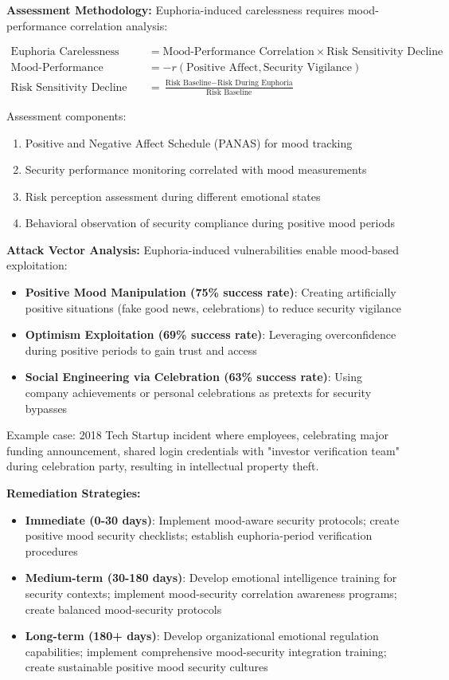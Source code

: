\documentclass[11pt,a4paper]{article}
\begin{document}
\textbf{Assessment Methodology:}
Euphoria-induced carelessness requires mood-performance correlation analysis:

\begin{align}
\text{Euphoria Carelessness Index} &= \text{Mood-Performance Correlation} \times \text{Risk Sensitivity Decline} \\
\text{Mood-Performance Correlation} &= -r(\text{Positive Affect}, \text{Security Vigilance}) \\
\text{Risk Sensitivity Decline} &= \frac{\text{Risk Baseline} - \text{Risk During Euphoria}}{\text{Risk Baseline}}
\end{align}

Assessment components:
\begin{enumerate}
\item Positive and Negative Affect Schedule (PANAS) for mood tracking
\item Security performance monitoring correlated with mood measurements
\item Risk perception assessment during different emotional states
\item Behavioral observation of security compliance during positive mood periods
\end{enumerate}

\textbf{Attack Vector Analysis:}
Euphoria-induced vulnerabilities enable mood-based exploitation:
\begin{itemize}
\item \textbf{Positive Mood Manipulation (75\% success rate)}: Creating artificially positive situations (fake good news, celebrations) to reduce security vigilance
\item \textbf{Optimism Exploitation (69\% success rate)}: Leveraging overconfidence during positive periods to gain trust and access
\item \textbf{Social Engineering via Celebration (63\% success rate)}: Using company achievements or personal celebrations as pretexts for security bypasses
\end{itemize}

Example case: 2018 Tech Startup incident where employees, celebrating major funding announcement, shared login credentials with "investor verification team" during celebration party, resulting in intellectual property theft.

\textbf{Remediation Strategies:}
\begin{itemize}
\item \textbf{Immediate (0-30 days)}: Implement mood-aware security protocols; create positive mood security checklists; establish euphoria-period verification procedures
\item \textbf{Medium-term (30-180 days)}: Develop emotional intelligence training for security contexts; implement mood-security correlation awareness programs; create balanced mood-security protocols
\item \textbf{Long-term (180+ days)}: Develop organizational emotional regulation capabilities; implement comprehensive mood-security integration training; create sustainable positive mood security cultures
\end{itemize}
\end{document}
